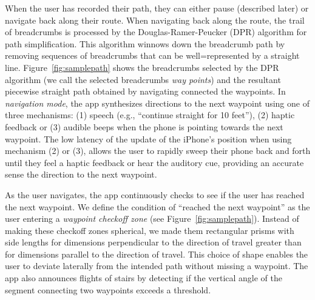 \documentclass[chi_draft]{sigchi}
\begin{document}
When the user has recorded their path, they can either pause (described later) or navigate back along their route.  When navigating back along the route, the trail of breadcrumbs is processed by the Douglas-Ramer-Peucker (DPR) algorithm \cite{douglas1973algorithms} for path simplification.  This algorithm winnows down the breadcrumb path by removing sequences of breadcrumbs that can be well=represented by a straight line.  Figure~\ref{fig:samplepath} shows the breadcrumbs selected by the DPR algorithm (we call the selected breadcrumbs \emph{way points}) and the resultant piecewise straight path obtained by navigating connected the waypoints.  In \emph{navigation mode}, the app synthesizes directions to the next waypoint using one of three mechanisms: (1) speech (e.g., ``continue straight for 10 feet''), (2) haptic feedback or (3) audible beeps when the phone is pointing towards the next waypoint.  The low latency of the update of the iPhone's position when using mechanism (2) or (3), allows the user to rapidly sweep their phone back and forth until they feel a haptic feedback or hear the auditory cue, providing an accurate sense the direction to the next waypoint.

As the user navigates, the app continuously checks to see if the user has reached the next waypoint.  We define the condition of ``reached the next waypoint'' as the user entering a \emph{waypoint checkoff zone} (see Figure~\ref{fig:samplepath}).  Instead of making these checkoff zones spherical, we made them rectangular prisms with side lengths for dimensions perpendicular to the direction of travel greater than for dimensions parallel to the direction of travel.  This choice of shape enables the user to deviate laterally from the intended path without missing a waypoint.  The app also announces flights of stairs by detecting if the vertical angle of the segment connecting two waypoints exceeds a threshold.
\end{document}
